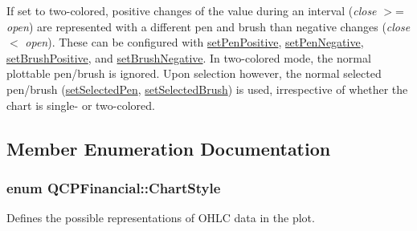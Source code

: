 If set to two-\/colored, positive changes of the value during an interval ({\itshape close} $>$= {\itshape open}) are represented with a different pen and brush than negative changes ({\itshape close} $<$ {\itshape open}). These can be configured with \hyperlink{class_q_c_p_financial_ac58aa3adc7a35aab0088764b840683e5}{set\+Pen\+Positive}, \hyperlink{class_q_c_p_financial_afe5c07e94ccea01a75b3a2476993c346}{set\+Pen\+Negative}, \hyperlink{class_q_c_p_financial_a5ebff2b1764efd07cc44942e67821829}{set\+Brush\+Positive}, and \hyperlink{class_q_c_p_financial_a8bbdd87629f9144b3ef51af660c0961a}{set\+Brush\+Negative}. In two-\/colored mode, the normal plottable pen/brush is ignored. Upon selection however, the normal selected pen/brush (\hyperlink{class_q_c_p_abstract_plottable_a6911603cad23ab0469b108224517516f}{set\+Selected\+Pen}, \hyperlink{class_q_c_p_abstract_plottable_ae8c816874089f7a44001e8618e81a9dc}{set\+Selected\+Brush}) is used, irrespective of whether the chart is single-\/ or two-\/colored. 

\subsection{Member Enumeration Documentation}
\subsubsection[{\texorpdfstring{Chart\+Style}{ChartStyle}}]{\setlength{\rightskip}{0pt plus 5cm}enum {\bf Q\+C\+P\+Financial\+::\+Chart\+Style}}\hypertarget{class_q_c_p_financial_a0f800e21ee98d646dfc6f8f89d10ebfb}{}\label{class_q_c_p_financial_a0f800e21ee98d646dfc6f8f89d10ebfb}
Defines the possible representations of O\+H\+LC data in the plot.

